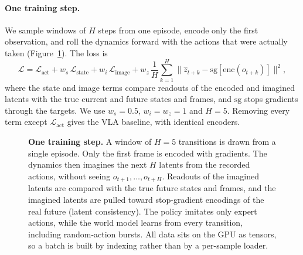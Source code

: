 \documentclass[11pt]{article}
\begin{document}
\paragraph{One training step.} We sample windows of $H$ steps from one episode, encode only the first observation, and roll the dynamics forward with the actions that were actually taken (Figure~\ref{fig:train}). The loss is
\begin{equation}
\mathcal{L} = \mathcal{L}_{\text{act}} + w_s\,\mathcal{L}_{\text{state}} + w_i\,\mathcal{L}_{\text{image}} + w_z\,\frac1H\sum_{k=1}^{H}\big\|\hat z_{t+k}-\mathrm{sg}[\mathrm{enc}(o_{t+k})]\big\|^2 ,
\label{eq:loss}
\end{equation}
where the state and image terms compare readouts of the encoded and imagined latents with the true current and future states and frames, and $\mathrm{sg}$ stops gradients through the targets. We use $w_s=0.5$, $w_i=w_z=1$ and $H=5$. Removing every term except $\mathcal{L}_{\text{act}}$ gives the VLA baseline, with identical encoders.

\begin{figure}[!htbp]
\centering
{}
\caption{\textbf{One training step.} A window of $H=5$ transitions is drawn from a single episode. Only the first frame is encoded with gradients. The dynamics then imagines the next $H$ latents from the recorded actions, without seeing $o_{t+1}, \dots, o_{t+H}$. Readouts of the imagined latents are compared with the true future states and frames, and the imagined latents are pulled toward stop-gradient encodings of the real future (latent consistency). The policy imitates only expert actions, while the world model learns from every transition, including random-action bursts. All data sits on the GPU as tensors, so a batch is built by indexing rather than by a per-sample loader.}
\label{fig:train}
\end{figure}
\end{document}

